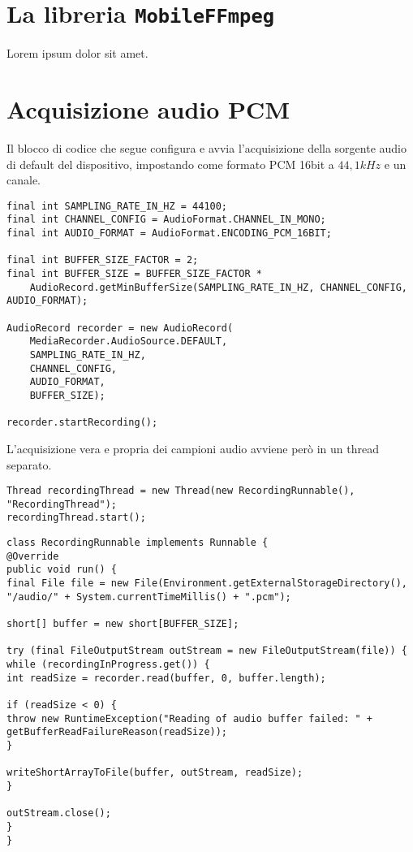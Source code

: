 \chapter{La libreria \texttt{MobileFFmpeg}}
\label{cha:allegato_ffmpeg}

Lorem ipsum dolor sit amet.

\chapter{Acquisizione audio PCM}
\label{cha:allegato_pcm}

Il blocco di codice che segue configura e avvia l'acquisizione della sorgente audio di default del dispositivo, impostando come formato PCM 16bit a $44,1 kHz$ e un canale.

\begin{verbatim}
final int SAMPLING_RATE_IN_HZ = 44100;
final int CHANNEL_CONFIG = AudioFormat.CHANNEL_IN_MONO;
final int AUDIO_FORMAT = AudioFormat.ENCODING_PCM_16BIT;

final int BUFFER_SIZE_FACTOR = 2;
final int BUFFER_SIZE = BUFFER_SIZE_FACTOR *
    AudioRecord.getMinBufferSize(SAMPLING_RATE_IN_HZ, CHANNEL_CONFIG, AUDIO_FORMAT);

AudioRecord recorder = new AudioRecord(
    MediaRecorder.AudioSource.DEFAULT,
    SAMPLING_RATE_IN_HZ,
    CHANNEL_CONFIG,
    AUDIO_FORMAT,
    BUFFER_SIZE);

recorder.startRecording();
\end{verbatim}

L'acquisizione vera e propria dei campioni audio avviene però in un thread separato.

\begin{verbatim}
Thread recordingThread = new Thread(new RecordingRunnable(), "RecordingThread");
recordingThread.start();
\end{verbatim}

\begin{verbatim}
class RecordingRunnable implements Runnable {
@Override
public void run() {
final File file = new File(Environment.getExternalStorageDirectory(), "/audio/" + System.currentTimeMillis() + ".pcm");

short[] buffer = new short[BUFFER_SIZE];

try (final FileOutputStream outStream = new FileOutputStream(file)) {
while (recordingInProgress.get()) {
int readSize = recorder.read(buffer, 0, buffer.length);

if (readSize < 0) {
throw new RuntimeException("Reading of audio buffer failed: " + getBufferReadFailureReason(readSize));
}

writeShortArrayToFile(buffer, outStream, readSize);
}

outStream.close();
}
}
\end{verbatim}

